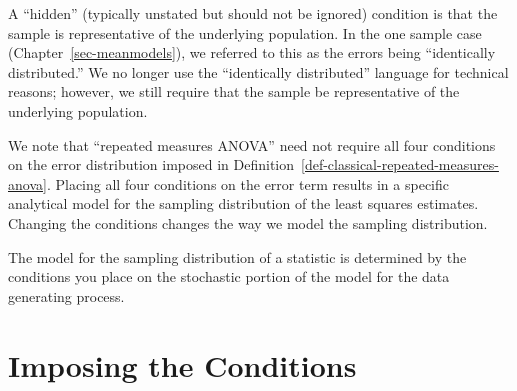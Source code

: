 \documentclass[
  letterpaper,
  DIV=11,
  numbers=noendperiod]{scrreprt}
\theoremstyle{plain}
\theoremstyle{definition}
\theoremstyle{definition}
\theoremstyle{remark}
\begin{document}
\begin{tcolorbox}[enhanced jigsaw, breakable, titlerule=0mm, colframe=quarto-callout-warning-color-frame, bottomtitle=1mm, opacityback=0, rightrule=.15mm, toptitle=1mm, arc=.35mm, bottomrule=.15mm, left=2mm, title=\textcolor{quarto-callout-warning-color}{\faExclamationTriangle}\hspace{0.5em}{Warning}, leftrule=.75mm, coltitle=black, toprule=.15mm, colbacktitle=quarto-callout-warning-color!10!white, colback=white, opacitybacktitle=0.6]

A ``hidden'' (typically unstated but should not be ignored) condition is
that the sample is representative of the underlying population. In the
one sample case (Chapter~\ref{sec-meanmodels}), we referred to this as
the errors being ``identically distributed.'' We no longer use the
``identically distributed'' language for technical reasons; however, we
still require that the sample be representative of the underlying
population.

\end{tcolorbox}

We note that ``repeated measures ANOVA'' need not require all four
conditions on the error distribution imposed in
Definition~\ref{def-classical-repeated-measures-anova}. Placing all four
conditions on the error term results in a specific analytical model for
the sampling distribution of the least squares estimates. Changing the
conditions changes the way we model the sampling distribution.

\begin{tcolorbox}[enhanced jigsaw, breakable, titlerule=0mm, colframe=quarto-callout-tip-color-frame, bottomtitle=1mm, opacityback=0, rightrule=.15mm, toptitle=1mm, arc=.35mm, bottomrule=.15mm, left=2mm, title=\textcolor{quarto-callout-tip-color}{\faLightbulb}\hspace{0.5em}{Big Idea}, leftrule=.75mm, coltitle=black, toprule=.15mm, colbacktitle=quarto-callout-tip-color!10!white, colback=white, opacitybacktitle=0.6]

The model for the sampling distribution of a statistic is determined by
the conditions you place on the stochastic portion of the model for the
data generating process.

\end{tcolorbox}

\section{Imposing the Conditions}\label{imposing-the-conditions-2}
\end{document}

